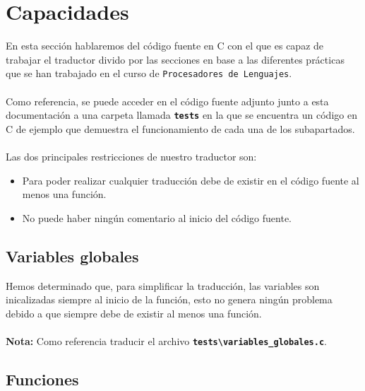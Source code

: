 \documentclass[]{article}
\begin{document}
        \section{Capacidades}
        En esta sección hablaremos del código fuente en C con el que es capaz de trabajar el traductor divido por las secciones en base a las diferentes prácticas que se han trabajado en el curso de \texttt{Procesadores de Lenguajes}. \\\\ Como referencia, se puede acceder en el código fuente adjunto junto a esta documentación a una carpeta llamada \texttt{\textbf{tests}} en la que se encuentra un código en C de ejemplo que demuestra el funcionamiento de cada una de los subapartados. \\\\ Las dos principales restricciones de nuestro traductor son: \\ \begin{itemize}
        \item Para poder realizar cualquier traducción debe de existir en el código fuente al menos una función.
        \item No puede haber ningún comentario al inicio del código fuente. \\
        \end{itemize}

        \subsection{Variables globales}
        Hemos determinado que, para simplificar la traducción, las variables son inicalizadas siempre al inicio de la función, esto no genera ningún problema debido a que siempre debe de existir al menos una función.\\\\
        \textbf{Nota:} Como referencia traducir el archivo \texttt{\textbf{tests\textbackslash variables\_{globales.c}}}.

        \subsection{Funciones}
        
        
\end{document}
